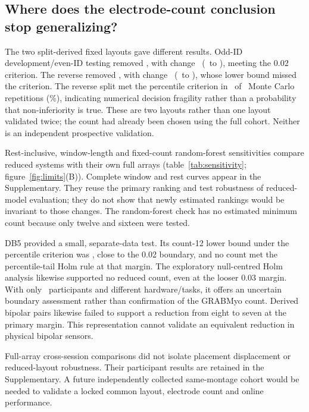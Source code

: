 \subsection{Where does the electrode-count conclusion stop generalizing?}
The two split-derived fixed layouts gave different results. Odd-ID development/even-ID testing removed \FixedDropped, with change \FixedDiff\ (\FixedLCB\ to \FixedUCB), meeting the 0.02 criterion. The reverse removed \FixedSwapDropped, with change \FixedSwapDiff\ (\FixedSwapLCBSix\ to \FixedSwapUCB), whose lower bound missed the criterion. The reverse split met the percentile criterion in \FixedLayoutMonteCarloHits\ of \FixedLayoutMonteCarloN\ Monte Carlo repetitions (\FixedLayoutMonteCarloPercent\%), indicating numerical decision fragility rather than a probability that non-inferiority is true. These are two layouts rather than one layout validated twice; the count had already been chosen using the full cohort. Neither is an independent prospective validation.

Rest-inclusive, window-length and fixed-count random-forest sensitivities compare reduced systems with their own full arrays (table~\ref{tab:sensitivity}; figure~\ref{fig:limits}(B)). Complete window and rest curves appear in the Supplementary. They reuse the primary ranking and test robustness of reduced-model evaluation; they do not show that newly estimated rankings would be invariant to those changes. The random-forest check has no estimated minimum count because only twelve and sixteen were tested.

DB5 provided a small, separate-data test. Its count-12 lower bound under the percentile criterion was \DBFiveDeltaKTwelveLCBSix, close to the 0.02 boundary, and no count met the percentile-tail Holm rule at that margin. The exploratory null-centred Holm analysis likewise supported no reduced count, even at the looser 0.03 margin. With only \DBFiveSubjects\ participants and different hardware/tasks, it offers an uncertain boundary assessment rather than confirmation of the GRABMyo count. Derived bipolar pairs likewise failed to support a reduction from eight to seven at the primary margin. This representation cannot validate an equivalent reduction in physical bipolar sensors.

Full-array cross-session comparisons did not isolate placement displacement or reduced-layout robustness. Their participant results are retained in the Supplementary. A future independently collected same-montage cohort would be needed to validate a locked common layout, electrode count and online performance.

